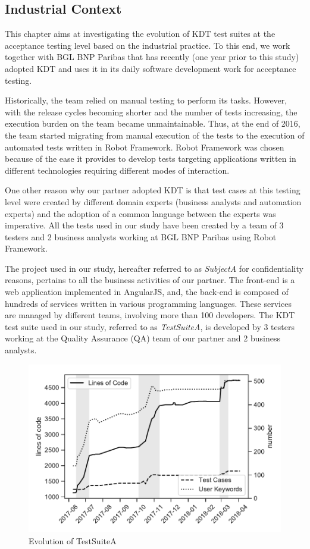 \subsection{Industrial Context}
\label{sec:evolution-introduction-data}

This chapter aims at investigating the evolution of KDT test suites at the acceptance testing level based on the industrial practice. To this end, we work together with BGL BNP Paribas that has recently (one year prior to this study) adopted KDT and uses it in its daily software development work for acceptance testing.


Historically, the team relied on manual testing to perform its tasks. However, with the release cycles becoming shorter and the number of tests increasing, the execution burden on the team became unmaintainable. Thus, at the end of 2016, the team started migrating from manual execution of the tests to the execution of automated tests written in Robot Framework. Robot Framework was chosen because of the ease it provides to develop tests targeting applications written in different technologies requiring different modes of interaction.

One other reason why our partner adopted KDT is that test cases at this testing level were created by different domain experts (business analysts and automation experts) and the adoption of a common language between the experts was imperative. All the tests used in our study have been created by a team of 3 testers and 2 business analysts working at BGL BNP Paribas using Robot Framework.

The project used in our study, hereafter referred to as \emph{SubjectA} for confidentiality reasons, pertains to all the business activities of our partner. The front-end is a web application implemented in AngularJS, and, the back-end is composed of hundreds of services written in various programming languages. These services are managed by different teams, involving more than 100 developers. The KDT test suite used in our study, referred to as \emph{TestSuiteA}, is developed by 3 testers working at the Quality Assurance (QA) team of our partner and 2 business analysts.

\begin{figure}[t!]
  \centering
  \includegraphics[width=0.7\columnwidth]{figures/evolution/project_evolution.pdf}
  \caption{Evolution of TestSuiteA}
  \label{fig:project_evolution}%
\end{figure}

